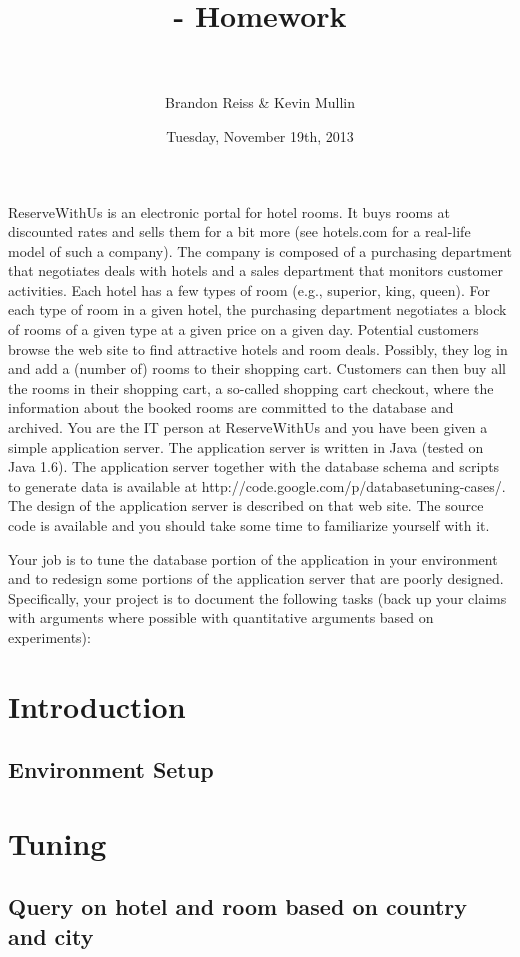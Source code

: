 \documentclass[letterpaper]{article}%
\author{%
  Brandon Reiss \& Kevin Mullin
}
\date{Tuesday, November 19th, 2013}
\title{%
  \CourseTitle{} - Homework \HomeworkSetNumber{} \\
  {\large \Instructor{}} \\
  {\large \CourseNumber{}}
}
\begin{document}
\noindent
\maketitle
\thispagestyle{empty}

\begin{problemcopy}
ReserveWithUs is an electronic portal for hotel rooms. It buys rooms at
discounted rates and sells them for a bit more (see hotels.com for a real-life
model of such a company). The company is composed of a purchasing department
that negotiates deals with hotels and a sales department that monitors customer
activities. Each hotel has a few types of room (e.g., superior, king, queen).
For each type of room in a given hotel, the purchasing department negotiates a
block of rooms of a given type at a given price on a given day. Potential
customers browse the web site to find attractive hotels and room deals.
Possibly, they log in and add a (number of) rooms to their shopping cart.
Customers can then buy all the rooms in their shopping cart, a so-called
shopping cart checkout, where the information about the booked rooms are
committed to the database and archived. You are the IT person at ReserveWithUs
and you have been given a simple application server. The application server is
written in Java (tested on Java 1.6). The application server together with the
database schema and scripts to generate data is available at
http://code.google.com/p/databasetuning-cases/. The design of the application
server is described on that web site. The source code is available and you
should take some time to familiarize yourself with it.

Your job is to tune the database portion of the application in your environment
and to redesign some portions of the application server that are poorly
designed. Specifically, your project is to document the following tasks (back
up your claims with arguments where possible with quantitative arguments based
on experiments):
\end{problemcopy}

\section{Introduction}
\subsection{Environment Setup}
\section{Tuning}
\subsection{Query on hotel and room based on country and city}
\end{document}
